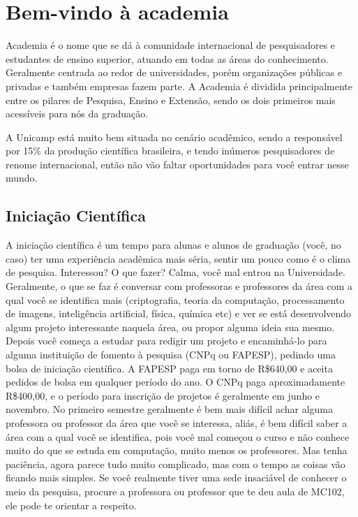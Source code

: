 
\section{Bem-vindo à academia}

Academia é o nome que se dá à comunidade internacional de pesquisadores e
estudantes de ensino superior, atuando em todas as áreas do conhecimento.
Geralmente centrada ao redor de universidades, porém organizações públicas e
privadas e também empresas fazem parte. A Academia é dividida principalmente
entre os pilares de Pesquisa, Ensino e Extensão, sendo os dois primeiros mais
acessíveis para nós da graduação.

A Unicamp está muito bem situada no cenário acadêmico, sendo a responsável por
15\% da produção científica brasileira, e tendo inúmeros pesquisadores de
renome internacional, então não vão faltar oportunidades para você entrar nesse
mundo.

\subsection{Iniciação Científica}

A iniciação científica é um tempo para alunas e alunos de graduação (você, no
caso) ter uma experiência acadêmica mais séria, sentir um pouco como é o clima
de pesquisa. Interessou? O que fazer? Calma, você mal entrou na Universidade.
Geralmente, o que se faz é conversar com professoras e professores da área com
a qual você se identifica mais (criptografia, teoria da computação,
processamento de imagens, inteligência artificial, física, química etc) e ver
se está desenvolvendo algum projeto interessante naquela área, ou propor alguma
ideia sua mesmo. Depois você começa a estudar para redigir um projeto e
encaminhá-lo para alguma instituição de fomento à pesquisa (CNPq ou FAPESP),
pedindo uma bolsa de iniciação científica. A FAPESP paga em torno de R\$640,00
e aceita pedidos de bolsa em qualquer período do ano. O CNPq paga
aproximadamente R\$400,00, e o período para inscrição de projetos é geralmente
em junho e novembro. No primeiro semestre geralmente é bem mais difícil achar
alguma professora ou professor da área que você se interessa, aliás, é bem
difícil saber a área com a qual você se identifica, pois você mal começou o
curso e não conhece muito do que se estuda em computação, muito menos os
professores. Mas tenha paciência, agora parece tudo muito complicado, mas com o
tempo as coisas vão ficando mais simples. Se você realmente tiver uma sede
insaciável de conhecer o meio da pesquisa, procure a professora ou professor
que te deu aula de MC102, ele pode te orientar a respeito.


